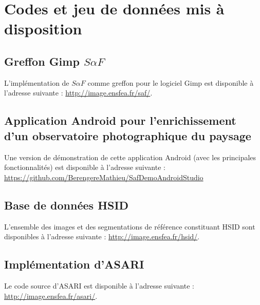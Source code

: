 \chapter{Codes et jeu de données mis à disposition}

\makeatletter
\let\c@section\@undefined
{}
\makeatother

\section{Greffon Gimp $S \alpha F$}

L'implémentation de $S \alpha F$ comme greffon pour le logiciel Gimp est disponible à l'adresse suivante : \url{http://image.ensfea.fr/saf/}.

\section{Application Android pour l'enrichissement d'un observatoire photographique du paysage}

Une version de démonstration de cette application Android (avec les principales fonctionnalités) est disponible à l'adresse suivante : \url{https://github.com/BerengereMathieu/SafDemoAndroidStudio}

\section{Base de données HSID}

L'ensemble des images et des segmentations de référence constituant HSID sont disponibles à l'adresse suivante : 
\url{http://image.ensfea.fr/hsid/}. 

\section{Implémentation d'ASARI}

Le code source d'ASARI est disponible à l'adresse suivante : \url{http://image.ensfea.fr/asari/}.